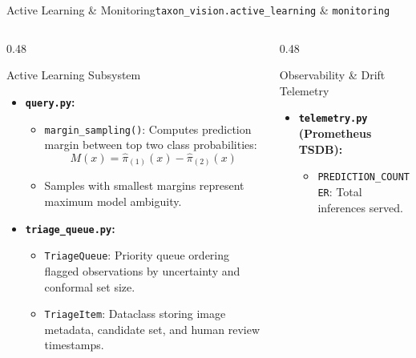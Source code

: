 \begin{frame}{Active Learning \& Monitoring}{\texttt{taxon\_vision.active\_learning} \& \texttt{monitoring}}
    \begin{columns}[T]
        \begin{column}{0.48\textwidth}
            \begin{block}{Active Learning Subsystem}
                \begin{itemize}\scriptsize
                    \item \textbf{\texttt{query.py}:}
                        \begin{itemize}\tiny
                            \item \texttt{margin\_sampling()}: Computes prediction margin between top two class probabilities:
                                $$M(x) = \hat{\pi}_{(1)}(x) - \hat{\pi}_{(2)}(x)$$
                            \item Samples with smallest margins represent maximum model ambiguity.
                        \end{itemize}
                    \item \textbf{\texttt{triage\_queue.py}:}
                        \begin{itemize}\tiny
                            \item \texttt{TriageQueue}: Priority queue ordering flagged observations by uncertainty and conformal set size.
                            \item \texttt{TriageItem}: Dataclass storing image metadata, candidate set, and human review timestamps.
                        \end{itemize}
                \end{itemize}
            \end{block}
        \end{column}
        \begin{column}{0.48\textwidth}
            \begin{block}{Observability \& Drift Telemetry}
                \begin{itemize}\scriptsize
                    \item \textbf{\texttt{telemetry.py} (Prometheus TSDB):}
                        \begin{itemize}\tiny
                            \item \texttt{PREDICTION\_COUNTER}: Total inferences served.

\end{itemize}
\end{itemize}
\end{block}
\end{column}
\end{columns}
\end{frame}
